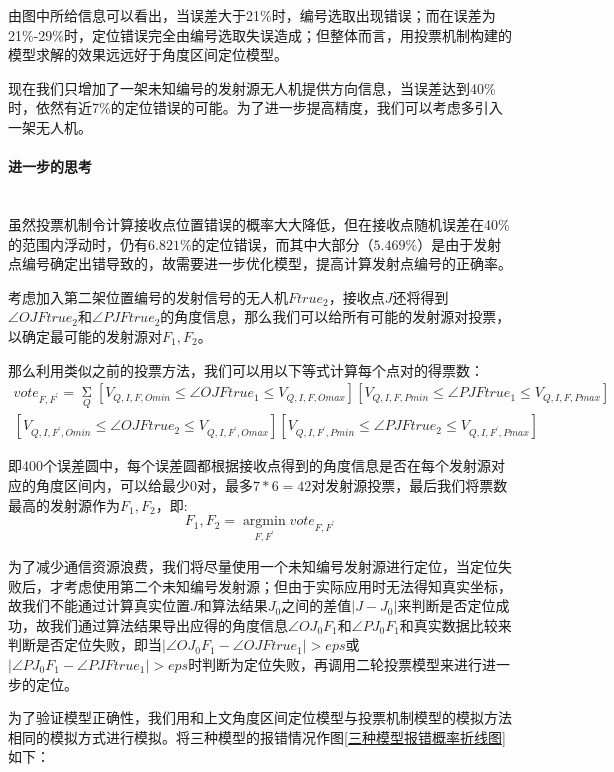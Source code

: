 \documentclass{ctexart}
\newcommand{\subsubsubsection}[1]{\paragraph{#1}\mbox{}\\}
\begin{document}
  由图中所给信息可以看出，当误差大于21\%时，编号选取出现错误；而在误差为21\%-29\%时，定位错误完全由编号选取失误造成；但整体而言，用投票机制构建的模型求解的效果远远好于角度区间定位模型。

  现在我们只增加了一架未知编号的发射源无人机提供方向信息，当误差达到40\%时，依然有近7\%的定位错误的可能。为了进一步提高精度，我们可以考虑多引入一架无人机。

  \subsubsubsection{进一步的思考}

  虽然投票机制令计算接收点位置错误的概率大大降低，但在接收点随机误差在40\%的范围内浮动时，仍有$6.821\%$的定位错误，而其中大部分（$5.469\%$）是由于发射点编号确定出错导致的，故需要进一步优化模型，提高计算发射点编号的正确率。

  考虑加入第二架位置编号的发射信号的无人机$Ftrue_2$，接收点$J$还将得到$\angle OJFtrue_2$和$\angle PJFtrue_2$的角度信息，那么我们可以给所有可能的发射源对投票，以确定最可能的发射源对$F_1,F_2$。

  那么利用类似之前的投票方法，我们可以用以下等式计算每个点对的得票数：
\begin{equation}
\begin{split}
    vote_{F,F^{'}}=\mathop{\Sigma}\limits_{Q} [V_{Q,I,F,Omin} \le \angle OJFtrue_1 \le V_{Q,I,F,Omax}][V_{Q,I,F,Pmin} \le \angle PJFtrue_1 \le V_{Q,I,F,Pmax}]\\
    [V_{Q,I,F^{'},Omin} \le \angle OJFtrue_2 \le V_{Q,I,F^{'},Omax}][V_{Q,I,F^{'},Pmin} \le \angle PJFtrue_2 \le V_{Q,I,F^{'},Pmax}]
\end{split}
\end{equation}

即400个误差圆中，每个误差圆都根据接收点得到的角度信息是否在每个发射源对应的角度区间内，可以给最少$0$对，最多$7*6=42$对发射源投票，最后我们将票数最高的发射源作为$F_1,F_2$，即:
\begin{equation}
 F_1,F_2=\mathop{\arg\min}\limits_{F,F^{'}} vote_{F,F^{'}}
\end{equation}

为了减少通信资源浪费，我们将尽量使用一个未知编号发射源进行定位，当定位失败后，才考虑使用第二个未知编号发射源；但由于实际应用时无法得知真实坐标，故我们不能通过计算真实位置$J$和算法结果$J_0$之间的差值$|J-J_0|$来判断是否定位成功，故我们通过算法结果导出应得的角度信息$\angle OJ_0F_1$和$\angle PJ_0F_1$和真实数据比较来判断是否定位失败，即当$|\angle OJ_0F_1 - \angle OJFtrue_1| > eps$或$|\angle PJ_0F_1 - \angle PJFtrue_1| > eps$时判断为定位失败，再调用二轮投票模型来进行进一步的定位。

为了验证模型正确性，我们用和上文角度区间定位模型与投票机制模型的模拟方法相同的模拟方式进行模拟。将三种模型的报错情况作图\ref{三种模型报错概率折线图}如下：
\end{document}
